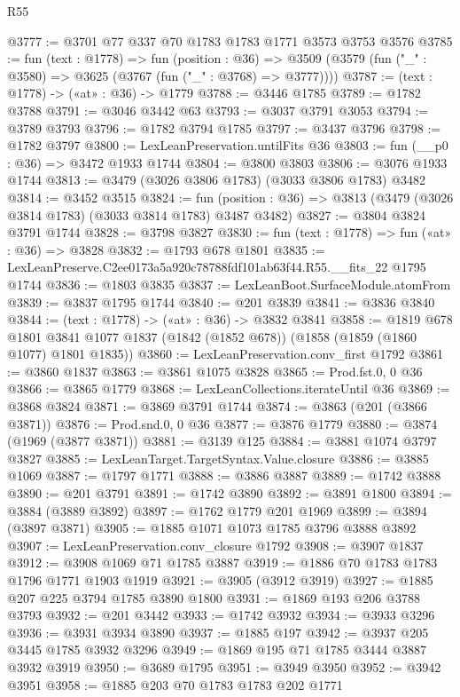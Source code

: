 \begin{lexlean}{R55}
\begin{coremodule}
@3777 := @3701 @77 @337 @70 @1783 @1783 @1771 @3573 @3753 @3576
@3785 := fun (text : @1778) =>
  fun (position : @36) =>
  @3509 (@3579 (fun ("_" : @3580) => @3625 (@3767 (fun ("_" : @3768) => @3777))))
@3787 := (text : @1778) -> («at» : @36) -> @1779
@3788 := @3446 @1785
@3789 := @1782 @3788
@3791 := @3046 @3442 @63
@3793 := @3037 @3791 @3053
@3794 := @3789 @3793
@3796 := @1782 @3794 @1785
@3797 := @3437 @3796
@3798 := @1782 @3797
@3800 := LexLeanPreservation.untilFits @36
@3803 := fun (__p0 : @36) => @3472 @1933 @1744
@3804 := @3800 @3803
@3806 := @3076 @1933 @1744
@3813 := @3479 (@3026 @3806 @1783) (@3033 @3806 @1783) @3482
@3814 := @3452 @3515
@3824 := fun (position : @36) => @3813 (@3479 (@3026 @3814 @1783) (@3033 @3814 @1783) @3487 @3482)
@3827 := @3804 @3824 @3791 @1744
@3828 := @3798 @3827
@3830 := fun (text : @1778) => fun («at» : @36) => @3828
@3832 := @1793 @678 @1801
@3835 := LexLeanPreserve.C2ee0173a5a920c78788fdf101ab63f44.R55.__fits_22 @1795 @1744
@3836 := @1803 @3835
@3837 := LexLeanBoot.SurfaceModule.atomFrom
@3839 := @3837 @1795 @1744
@3840 := @201 @3839
@3841 := @3836 @3840
@3844 := (text : @1778) -> («at» : @36) -> @3832 @3841
@3858 := @1819
    @678
    @1801
    @3841
    @1077
    @1837
    (@1842 (@1852 @678))
    (@1858 (@1859 (@1860 @1077) @1801 @1835))
@3860 := LexLeanPreservation.conv_first @1792
@3861 := @3860 @1837
@3863 := @3861 @1075 @3828
@3865 := Prod.fst.{0, 0} @36
@3866 := @3865 @1779
@3868 := LexLeanCollections.iterateUntil @36
@3869 := @3868 @3824
@3871 := @3869 @3791 @1744
@3874 := @3863 (@201 (@3866 @3871))
@3876 := Prod.snd.{0, 0} @36
@3877 := @3876 @1779
@3880 := @3874 (@1969 (@3877 @3871))
@3881 := @3139 @125
@3884 := @3881 @1074 @3797 @3827
@3885 := LexLeanTarget.TargetSyntax.Value.closure
@3886 := @3885 @1069
@3887 := @1797 @1771
@3888 := @3886 @3887
@3889 := @1742 @3888
@3890 := @201 @3791
@3891 := @1742 @3890
@3892 := @3891 @1800
@3894 := @3884 (@3889 @3892)
@3897 := @1762 @1779 @201 @1969
@3899 := @3894 (@3897 @3871)
@3905 := @1885 @1071 @1073 @1785 @3796 @3888 @3892
@3907 := LexLeanPreservation.conv_closure @1792
@3908 := @3907 @1837
@3912 := @3908 @1069 @71 @1785 @3887
@3919 := @1886 @70 @1783 @1783 @1796 @1771 @1903 @1919
@3921 := @3905 (@3912 @3919)
@3927 := @1885 @207 @225 @3794 @1785 @3890 @1800
@3931 := @1869 @193 @206 @3788 @3793
@3932 := @201 @3442
@3933 := @1742 @3932
@3934 := @3933 @3296
@3936 := @3931 @3934 @3890
@3937 := @1885 @197
@3942 := @3937 @205 @3445 @1785 @3932 @3296
@3949 := @1869 @195 @71 @1785 @3444 @3887 @3932 @3919
@3950 := @3689 @1795
@3951 := @3949 @3950
@3952 := @3942 @3951
@3958 := @1885 @203 @70 @1783 @1783 @202 @1771

\end{coremodule}
\end{lexlean}

